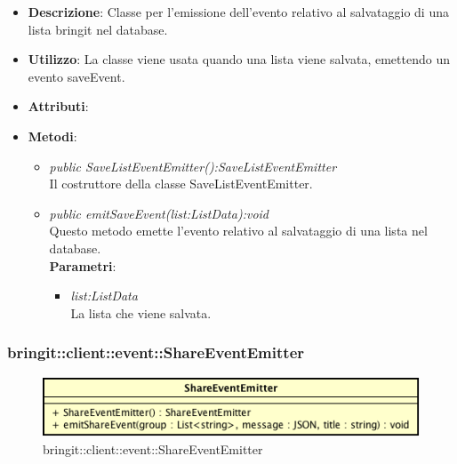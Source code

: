 \begin{itemize}
\item \textbf{Descrizione}: Classe per l'emissione dell'evento relativo al salvataggio di una lista bringit nel database. 
\item \textbf{Utilizzo}: La classe viene usata quando una lista viene salvata, emettendo un evento saveEvent.
\item \textbf{Attributi}: 
\item \textbf{Metodi}:
	\begin{itemize}
	\item \textit{public SaveListEventEmitter():SaveListEventEmitter}\\
	Il costruttore della classe SaveListEventEmitter.
	\item \textit{public emitSaveEvent(list:ListData):void}\\
	Questo metodo emette l'evento relativo al salvataggio di una lista nel database.
					\\ \textbf{Parametri}: \begin{itemize}
			\item \textit{list:ListData}\\
			La lista che viene salvata.
					\end{itemize}
	\end{itemize}
\end{itemize}

\subsubsection{bringit::client::event::ShareEventEmitter}

\label{bringit::client::event::ShareEventEmitter}
\begin{figure}[H]
	\centering
	\includegraphics[scale=0.5]{Sezioni/SottosezioniST/img/app/ShareEventEmitter.png}
	\caption{bringit::client::event::ShareEventEmitter}
\end{figure}

